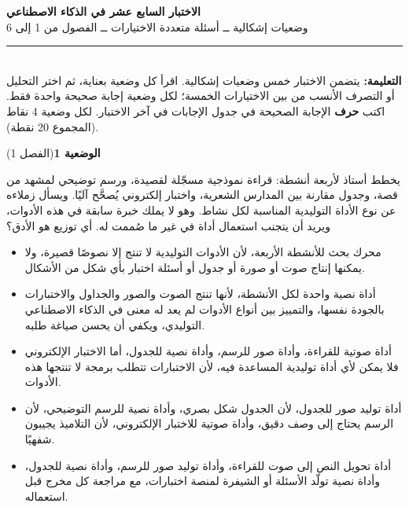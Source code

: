 \documentclass[11pt,a4paper]{article}
\begin{document}
\linespread{1.08}\selectfont
\begin{center}
{\LARGE\khatt\textbf{الاختبار السابع عشر في الذكاء الاصطناعي}}\\[4pt]
{\normalsize وضعيات إشكالية ــ أسئلة متعددة الاختيارات ــ الفصول من 1 إلى 6}
\end{center}
\vspace{-2pt}\rule{\textwidth}{0.6pt}\\[2pt]
\textbf{التعليمة:} يتضمن الاختبار خمس وضعيات إشكالية. اقرأ كل وضعية بعناية، ثم اختر التحليل أو التصرف الأنسب
من بين الاختيارات الخمسة؛ لكل وضعية إجابة صحيحة واحدة فقط.
اكتب \textbf{حرف} الإجابة الصحيحة في جدول الإجابات في آخر الاختبار.
لكل وضعية 4 نقاط (المجموع 20 نقطة).
\vspace{4pt}

\noindent
{\large\khatt\textbf{الوضعية 1}}\hfill{\small(الفصل 1)}\par\nopagebreak\vspace{3pt}
\setlength{\fboxsep}{7pt}\colorbox{gray!10}{\parbox{\dimexpr\linewidth-14pt}{يخطط أستاذ لأربعة أنشطة: قراءة نموذجية مسجّلة لقصيدة، ورسم توضيحي لمشهد من قصة، وجدول مقارنة بين المدارس الشعرية، واختبار إلكتروني يُصحَّح آليًا. ويسأل زملاءه عن نوع الأداة التوليدية المناسبة لكل نشاط. وهو لا يملك خبرة سابقة في هذه الأدوات، ويريد أن يتجنب استعمال أداة في غير ما صُممت له. أي توزيع هو الأدق؟}}\par\nopagebreak
\begin{itemize}[leftmargin=1.0cm, labelsep=6pt, itemsep=3pt, topsep=4pt, parsep=0pt]
  \item[\textbf{أ)}] محرك بحث للأنشطة الأربعة، لأن الأدوات التوليدية لا تنتج إلا نصوصًا قصيرة، ولا يمكنها إنتاج صوت أو صورة أو جدول أو أسئلة اختبار بأي شكل من الأشكال.
  \item[\textbf{ب)}] أداة نصية واحدة لكل الأنشطة، لأنها تنتج الصوت والصور والجداول والاختبارات بالجودة نفسها، والتمييز بين أنواع الأدوات لم يعد له معنى في الذكاء الاصطناعي التوليدي، ويكفي أن يحسن صياغة طلبه.
  \item[\textbf{ج)}] أداة صوتية للقراءة، وأداة صور للرسم، وأداة نصية للجدول، أما الاختبار الإلكتروني فلا يمكن لأي أداة توليدية المساعدة فيه، لأن الاختبارات تتطلب برمجة لا تنتجها هذه الأدوات.
  \item[\textbf{د)}] أداة توليد صور للجدول، لأن الجدول شكل بصري، وأداة نصية للرسم التوضيحي، لأن الرسم يحتاج إلى وصف دقيق، وأداة صوتية للاختبار الإلكتروني، لأن التلاميذ يجيبون شفهيًا.
  \item[\textbf{هـ)}] أداة تحويل النص إلى صوت للقراءة، وأداة توليد صور للرسم، وأداة نصية للجدول، وأداة نصية تولّد الأسئلة أو الشيفرة لمنصة اختبارات، مع مراجعة كل مخرج قبل استعماله.
\end{itemize}
\end{document}
